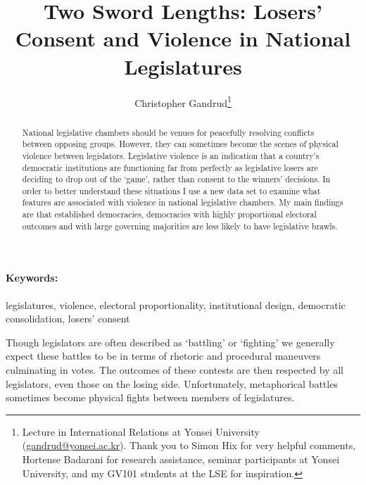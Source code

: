 \documentclass[a4paper]{article}\usepackage{graphicx, color}
\title{Two Sword Lengths: Losers' Consent and Violence in National Legislatures}
\author{Christopher Gandrud\thanks{Lecture in International Relations at Yonsei University (\href{mailto:gandrud@yonsei.ac.kr}{gandrud@yonsei.ac.kr}). Thank you to Simon Hix for very helpful comments, Hortense Badarani for research assistance, seminar participants at Yonsei University, and my GV101 students at the LSE for inspiration.
}}
\date{}
\begin{document}
\maketitle

\begin{abstract}
National legislative chambers should be venues for peacefully resolving conflicts between opposing groups. However, they can sometimes become the scenes of physical violence between legislators. Legislative violence is an indication that a country's democratic institutions are functioning far from perfectly as legislative losers are deciding to drop out of the `game', rather than consent to the winners' decisions. In order to better understand these situations I use a new data set to examine what features are associated with violence in national legislative chambers. My main findings are that established democracies, democracies with highly proportional electoral outcomes and with large governing majorities are less likely to have legislative brawls.

\end{abstract}


\paragraph{Keywords:} legislatures, violence, electoral proportionality, institutional design, democratic consolidation, losers' consent

\vspace{0.3cm}


Though legislators are often described as `battling' or `fighting' we generally expect these battles to be in terms of rhetoric and procedural maneuvers culminating in votes. The outcomes of these contests are then respected by all legislators, even those on the losing side. Unfortunately, metaphorical battles sometimes become physical fights between members of legislatures. 
\end{document}
